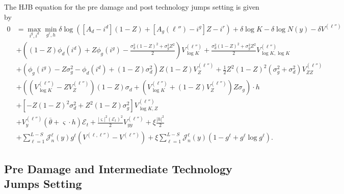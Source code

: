 \documentclass[12pt]{article}
\begin{document}
\begin{appendices}
The HJB equation for the pre damage and post technology jumps setting is given by
\begin{equation*}
\begin{split}
0 & = \max_{i^{g},i^{d}} \min_{g^{\ell}, h} \delta\log([A_{d}-i^{d}](1-Z)+[A_{g}(\ell'')-i^{g}]Z -i^{r}) + \delta\log K - \delta \log N(y) - \delta V^{(\ell'')} \\
& + \left((1-Z) \phi_d(i^{d}) + Z \phi_g(i^{g}) -\frac{   \sigma_d^2 (1-Z)^2 + \sigma_g^2 Z^2 }{2} \right)V^{(\ell'')}_{\log K} + \frac{  \sigma_d^2 (1-Z)^2 + \sigma_g^2 Z^2}{2} V^{(\ell'')}_{\log K,  \log K}  \\
 & +\left( \phi_g(i^{g}) - Z \sigma_g^2 - \phi_d(i^{d}) + (1-Z) \sigma_d^2  \right) Z (1-Z) V^{(\ell'')}_{Z} + \frac{1}{2} Z^2 (1-Z)^2 ({ \sigma_g^2 + \sigma_d^2} ) V^{(\ell'')}_{ZZ} \\
 & + \left( \left( V^{(\ell'')}_{\log K} -  Z V^{(\ell'')}_{Z} \right) (1-Z) \sigma_d  + \left( V^{(\ell'')}_{\log K} + (1-Z) V^{(\ell'')}_{Z} \right)  Z \sigma_g \right) \cdot h \\
  & + \left[-Z(1-Z)^2\sigma_d^2 + Z^2(1-Z)\sigma_g^2\right]V^{(\ell'')}_{\log K, Z} \\
 & + V^{(\ell'')}_{y} (\bar{\theta} + \varsigma \cdot h) \mathcal{E}_t +\frac{|\varsigma|^{2}( \mathcal{E}_t)^{2}}{2} V^{(\ell'')}_{yy} + \xi \frac{|h|^2}{2} \\
 & +  \sum_{\ell=1}^{L-S} \mathcal{J}^{\ell}_n(y) g^{\ell} (V^{(\ell,\ell'')} - V^{(\ell'')})  +  \xi \sum_{\ell=1}^{L-S} \mathcal{J}^{\ell}_n(y) \left( 1 - g^{\ell} + g^{\ell} \log g^{\ell} \right) .
\end{split}
\end{equation*}

\subsection{Pre Damage and Intermediate Technology Jumps Setting}



\end{appendices}
\end{document}
